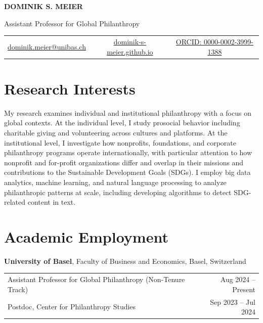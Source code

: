 \documentclass[11pt,letterpaper]{article}
\begin{document}
\begin{center}
    {\Huge\bfseries\color{headercolor} DOMINIK S. MEIER}
    
    \vspace{0.3em}
    
    {\large Assistant Professor for Global Philanthropy}
    
    \vspace{0.5em}
    
    \begin{tabular}{c c c}
        \href{mailto:dominik.meier@unibas.ch}{dominik.meier@unibas.ch} &
        \href{https://dominik-s-meier.github.io}{dominik-s-meier.github.io} &
        \href{https://orcid.org/0000-0002-3999-1388}{ORCID: 0000-0002-3999-1388}
    \end{tabular}
\end{center}

\vspace{1em}

\section*{Research Interests}

My research examines individual and institutional philanthropy with a focus on global contexts. At the individual level, I study prosocial behavior including charitable giving and volunteering across cultures and platforms. At the institutional level, I investigate how nonprofits, foundations, and corporate philanthropy programs operate internationally, with particular attention to how nonprofit and for-profit organizations differ and overlap in their missions and contributions to the Sustainable Development Goals (SDGs). I employ big data analytics, machine learning, and natural language processing to analyze philanthropic patterns at scale, including developing algorithms to detect SDG-related content in text.

\section*{Academic Employment}

\textbf{University of Basel}, Faculty of Business and Economics, Basel, Switzerland

\begin{tabular}{@{}p{}r@{}}
Assistant Professor for Global Philanthropy (Non-Tenure Track) & Aug 2024 -- Present \\
Postdoc, Center for Philanthropy Studies & Sep 2023 -- Jul 2024 \\
\end{tabular}
\end{document}
